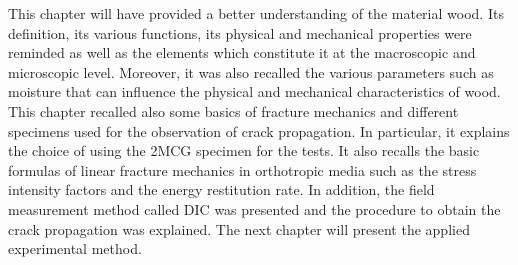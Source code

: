 This chapter will have provided a better understanding of the material wood. Its definition, its various functions, its physical and mechanical properties were reminded as well as the elements which constitute it at the macroscopic and microscopic level. Moreover, it was also recalled the various parameters such as moisture that can influence the physical and mechanical characteristics of wood.
This chapter recalled also some basics of fracture mechanics and different specimens used for the observation of crack propagation. In particular, it explains the choice of using the 2MCG specimen for the tests. It also recalls the basic formulas of linear fracture mechanics in orthotropic media such as the stress intensity factors and the energy restitution rate. In addition, the field measurement method called DIC was presented and the procedure to obtain the crack propagation was explained. The next chapter will present the applied experimental method.


